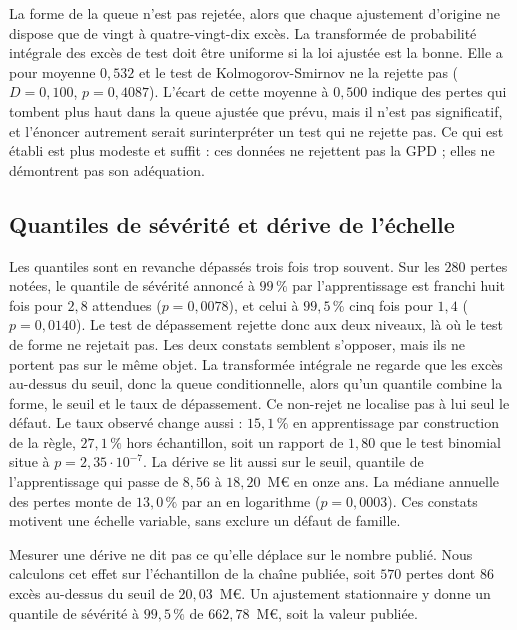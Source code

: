 La forme de la queue n'est pas rejetée, alors que chaque ajustement d'origine ne dispose que de vingt à
quatre-vingt-dix excès. La transformée de probabilité intégrale des excès de test doit être uniforme si la loi
ajustée est la bonne. Elle a pour moyenne $0{,}532$ et le test de Kolmogorov-Smirnov ne la rejette pas
($D=0{,}100$, $p=0{,}4087$). L'écart de cette moyenne à $0{,}500$ indique des pertes qui tombent plus haut
dans la queue ajustée que prévu, mais il n'est pas significatif, et l'énoncer autrement serait
surinterpréter un test qui ne rejette pas. Ce qui est établi est plus modeste et suffit : ces données ne rejettent pas la GPD ; elles ne démontrent pas son adéquation.

\subsection{Quantiles de sévérité et dérive de l'échelle}

Les quantiles sont en revanche dépassés trois fois trop souvent. Sur les $280$ pertes notées, le quantile de
sévérité annoncé à $99\,\%$ par l'apprentissage est franchi huit fois pour $2{,}8$ attendues ($p=0{,}0078$), et
celui à $99{,}5\,\%$ cinq fois pour $1{,}4$ ($p=0{,}0140$). Le test de dépassement rejette donc aux deux
niveaux, là où le test de forme ne rejetait pas. Les deux constats semblent s'opposer, mais ils ne portent pas
sur le même objet. La transformée intégrale ne regarde que les excès au-dessus du seuil, donc la queue
conditionnelle, alors qu'un quantile combine la forme, le seuil et le taux de dépassement. Ce non-rejet ne localise pas à lui seul le défaut. Le taux observé change aussi : $15{,}1\,\%$ en apprentissage par
construction de la règle, $27{,}1\,\%$ hors échantillon, soit un rapport de $1{,}80$ que le test binomial situe
à $p=2{,}35\cdot 10^{-7}$. La dérive se lit aussi sur le seuil, quantile de l'apprentissage qui passe
de $8{,}56$ à $18{,}20$~M\euro{} en onze ans. La médiane annuelle des pertes monte de $13{,}0\,\%$ par
an en logarithme ($p=0{,}0003$). Ces constats motivent une échelle variable, sans exclure un défaut de famille.

Mesurer une dérive ne dit pas ce qu'elle déplace sur le nombre publié. Nous calculons cet effet sur l'échantillon
de la chaîne publiée, soit $570$ pertes dont $86$ excès au-dessus du seuil de $20{,}03$~M\euro. Un
ajustement stationnaire y donne un quantile de sévérité à $99{,}5\,\%$ de $662{,}78$~M\euro, soit la valeur
publiée.

